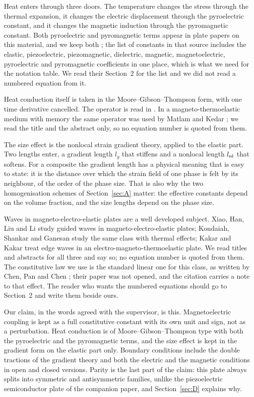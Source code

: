 \documentclass[11pt,a4paper]{article}
\begin{document}
Heat enters through three doors. The temperature changes the stress through the thermal expansion, it
changes the electric displacement through the pyroelectric constant, and it changes the magnetic induction
through the pyromagnetic constant. Both pyroelectric and pyromagnetic terms appear in plate papers on this
material, and we keep both \cite{Tocci2021}; the list of constants in that source includes the elastic,
piezoelectric, piezomagnetic, dielectric, magnetic, magnetoelectric, pyroelectric and pyromagnetic
coefficients in one place, which is what we need for the notation table. We read their Section~2 for the
list and we did not read a numbered equation from it.

Heat conduction itself is taken in the Moore--Gibson--Thompson form, with one time derivative cancelled. The
operator is read in \cite[Eqs.~(2.5) and (3.1)--(3.5)]{Quintanilla2019}. In a magneto-thermoelastic medium with memory
the same operator was used by Matlam and Kedar \cite{Matlam2026}; we read the title and the
abstract only, so no equation number is quoted from them.

The size effect is the nonlocal strain gradient theory, applied to the elastic part. Two lengths enter, a
gradient length $l_g$ that stiffens and a nonlocal length $l_{\rm nl}$ that softens. For a composite the
gradient length has a physical meaning that is easy to state: it is the distance over which the strain field
of one phase is felt by its neighbour, of the order of the phase size. That is also why the two
homogenisation schemes of Section~\ref{sec:A} matter: the effective constants depend on the volume fraction,
and the size lengths depend on the phase size.

Waves in magneto-electro-elastic plates are a well developed subject. Xiao, Han, Liu and Li \cite{Xiao2016}
study guided waves in magneto-electro-elastic plates; Kondaiah, Shankar and Ganesan \cite{Kondaiah2013}
study the same class with thermal effects; Kakar and Kakar \cite{Kakar2015} treat edge waves in an
electro-magneto-thermoelastic plate. We read titles and abstracts for all three and say so; no equation
number is quoted from them. The constitutive law we use is the standard linear one for this class, as
written by Chen, Pan and Chen \cite{Chen2007}; their paper was not opened, and the citation carries a note
to that effect. The reader who wants the numbered equations should go to \cite{Chen2007} Section~2 and
write them beside ours.

Our claim, in the words agreed with the supervisor, is this. Magnetoelectric coupling is kept as a full
constitutive constant with its own unit and sign, not as a perturbation. Heat conduction is of
Moore--Gibson--Thompson type with both the pyroelectric and the pyromagnetic terms, and the size effect is
kept in the gradient form on the elastic part only. Boundary conditions include the double tractions of the
gradient theory and both the electric and the magnetic conditions in open and closed versions. Parity is
the last part of the claim: this plate always splits into symmetric and antisymmetric families, unlike the
piezoelectric semiconductor plate of the companion paper, and Section~\ref{sec:D} explains why.
\end{document}
